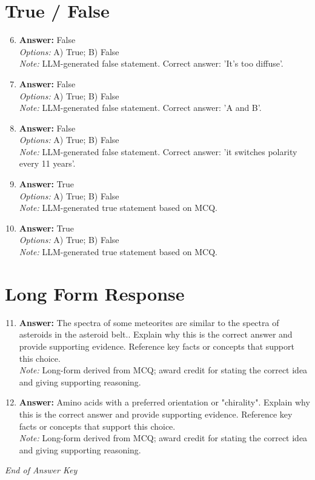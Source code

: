 \documentclass[12pt]{article}
\begin{document}
\section*{True / False}
\begin{enumerate}[label=\arabic*.]
\setcounter{enumi}{5}
\item \textbf{Answer:} False
\\ \textit{Options:} A) True; B) False
\\ \textit{Note:} LLM-generated false statement. Correct answer: 'It's too diffuse'.
\item \textbf{Answer:} False
\\ \textit{Options:} A) True; B) False
\\ \textit{Note:} LLM-generated false statement. Correct answer: 'A and B'.
\item \textbf{Answer:} False
\\ \textit{Options:} A) True; B) False
\\ \textit{Note:} LLM-generated false statement. Correct answer: 'it switches polarity every 11 years'.
\item \textbf{Answer:} True
\\ \textit{Options:} A) True; B) False
\\ \textit{Note:} LLM-generated true statement based on MCQ.
\item \textbf{Answer:} True
\\ \textit{Options:} A) True; B) False
\\ \textit{Note:} LLM-generated true statement based on MCQ.
\end{enumerate}

\section*{Long Form Response}
\begin{enumerate}[label=\arabic*.]
\setcounter{enumi}{10}
\item \textbf{Answer:} The spectra of some meteorites are similar to the spectra of asteroids in the asteroid belt.. Explain why this is the correct answer and provide supporting evidence. Reference key facts or concepts that support this choice.
\\ \textit{Note:} Long-form derived from MCQ; award credit for stating the correct idea and giving supporting reasoning.
\item \textbf{Answer:} Amino acids with a preferred orientation or "chirality". Explain why this is the correct answer and provide supporting evidence. Reference key facts or concepts that support this choice.
\\ \textit{Note:} Long-form derived from MCQ; award credit for stating the correct idea and giving supporting reasoning.
\end{enumerate}

\vfill
\noindent\textit{End of Answer Key}
\end{document}
